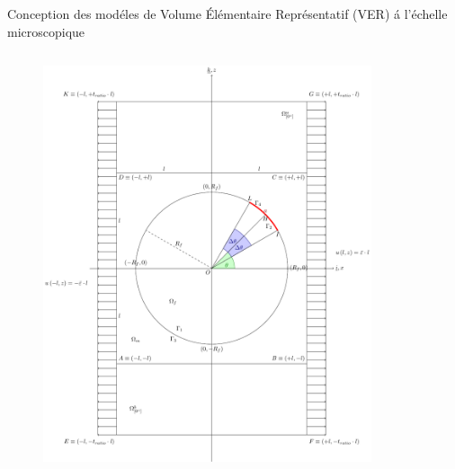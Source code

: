 \documentclass[final]{beamer}
\begin{document}
\begin{frame}
\begin{center}
\begin{minipage}{\textwidth}
\begin{exampleblock}{\rule[-0.6ex]{0pt}{50pt}\centering\LARGE Conception des mod\'eles de Volume \'El\'ementaire Repr\'esentatif (VER) \'a l'\'echelle microscopique}
\begin{columns}
\begin{column}{0.125\textwidth}
\begin{figure}[!h]
\centering
   \includegraphics[width=\columnwidth]{boundedRVE_cc.pdf}
\end{figure}
\end{column}
\begin{column}{0.15\textwidth}
\begin{figure}[!h]
\centering

\end{figure}
\end{column}
\end{columns}
\end{exampleblock}
\end{minipage}
\end{center}
\end{frame}
\end{document}
